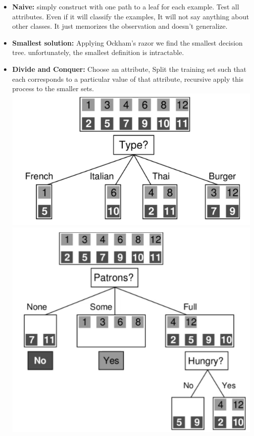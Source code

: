 \documentclass{article}
\begin{document}
\begin{itemize}
\item \textbf{Naive: }simply construct with one path to a leaf for each example. Test all attributes. Even if it will classify the examples, It will not say anything about other classes. It just memorizes the observation and doesn't generalize.
\item \textbf{Smallest solution: } Applying Ockham's razor we find the smallest decision tree. unfortunately, the smallest definition is intractable.
\item \textbf{Divide and Conquer: }Choose an attribute, Split the training set such that each corresponds to a particular value of that attribute, recursive apply this process to the smaller sets.\\
\includegraphics[scale=0.3]{86.png}\includegraphics[scale=0.3]{87.png}\\\\

\end{itemize}
\end{document}
